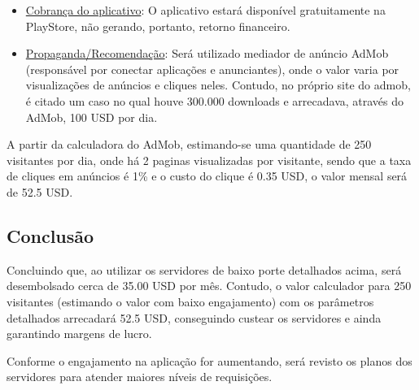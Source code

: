 \begin{itemize}
	\item \underline{Cobrança do aplicativo}: O aplicativo estará disponível gratuitamente na PlayStore, não gerando, portanto, retorno financeiro.
	\item \underline{Propaganda/Recomendação}: Será utilizado mediador de anúncio AdMob (responsável por conectar aplicações e anunciantes), onde o valor varia por visualizações de anúncios e cliques neles. Contudo, no próprio site do admob, é citado um caso no qual houve 300.000 downloads e arrecadava, através do AdMob, 100 USD por dia. \cite{GoogleAdMob}
\end{itemize}

A partir da calculadora do AdMob, estimando-se uma quantidade de 250 visitantes por dia, onde há 2 paginas visualizadas por visitante, sendo que a taxa de cliques em anúncios é 1\% e o custo do clique é 0.35 USD, o valor mensal será de 52.5 USD.

\subsection{Conclusão}

Concluindo que, ao utilizar os servidores de baixo porte detalhados acima, será desembolsado cerca de 35.00 USD por mês. Contudo, o valor calculador para 250 visitantes (estimando o valor com baixo engajamento) com os parâmetros detalhados arrecadará 52.5 USD, conseguindo custear os servidores e ainda garantindo margens de lucro.

Conforme o engajamento na aplicação for aumentando, será revisto os planos dos servidores para atender maiores níveis de requisições.

